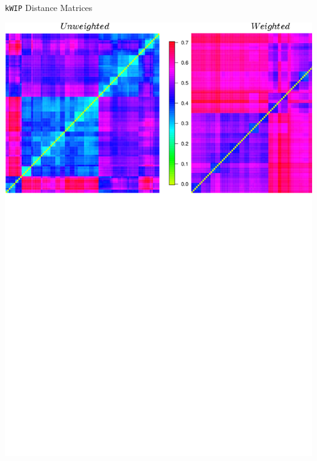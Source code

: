\documentclass[t]{beamer}
\begin{document}
\begin{frame}{\texttt{kWIP} Distance Matrices}
  \begin{center}
    \includegraphics[width=\textwidth]{img/weight-unweight.png}
  \end{center}
\end{frame}
\end{document}
